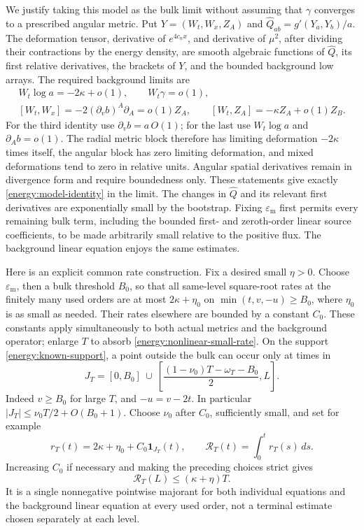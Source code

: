 We justify taking this model as the bulk limit without assuming that
\(\gamma\) converges to a prescribed angular metric. Put
\(Y=(W_t,W_x,Z_A)\) and \(\widehat Q_{ab}=g'(Y_a,Y_b)/a\).
The deformation tensor, derivative of \(e^{4c_nx}\), and derivative
of \(\mu^2\), after dividing their contractions by the energy
density, are smooth algebraic functions of \(\widehat Q\), its
first relative derivatives, the brackets of \(Y\), and the bounded
background low arrays. The required background limits are
\begin{equation}\label{energy:deformation-limits}
 \begin{gathered}
 W_t\log a=-2\kappa+o(1),\qquad W_t\gamma=o(1),\\
 [W_t,W_x]=-2(\partial_vb)^A\partial_A=o(1)Z_A,\qquad
 [W_t,Z_A]=-\kappa Z_A+o(1)Z_B.
 \end{gathered}
\end{equation}
For the third identity use \(\partial_vb=a\,O(1)\); for the last
use \(W_t\log a\) and \(\partial_Ab=o(1)\). The radial metric
block therefore has limiting deformation \(-2\kappa\) times
itself, the angular block has zero limiting deformation, and mixed
deformations tend to zero in relative units. Angular spatial
derivatives remain in divergence form and require boundedness only.
These statements give exactly \eqref{energy:model-identity} in the
limit. The changes in \(\widehat Q\) and its relevant first
derivatives are exponentially small by the bootstrap. Fixing
\(\varepsilon_{\mathrm m}\) first permits every remaining bulk term, including
the bounded first- and zeroth-order linear source coefficients, to be
made arbitrarily small relative to the positive flux. The background
linear equation enjoys the same estimates.

Here is an explicit common rate construction. Fix a desired small
\(\eta>0\). Choose \(\varepsilon_{\mathrm m}\), then a bulk threshold
\(B_0\), so that all same-level square-root rates at the finitely
many used orders are at most \(2\kappa+\eta_0\) on
\(\min(t,v,-u)\ge B_0\), where \(\eta_0\) is as small as needed.
Their rates elsewhere are bounded by a constant \(C_0\). These
constants apply simultaneously to both actual metrics and the
background operator; enlarge \(T\) to absorb
\eqref{energy:nonlinear-small-rate}. On the support
\eqref{energy:known-support}, a point outside the bulk can occur only
at times in
\[
 J_T=[0,B_0]\ \cup\
 \left[\frac{(1-\nu_0)T-\omega_T-B_0}{2},L\right].
\]
Indeed \(v\ge B_0\) for large \(T\), and \(-u=v-2t\).
In particular \(|J_T|\le\nu_0T/2+O(B_0+1)\). Choose \(\nu_0\)
after \(C_0\), sufficiently small, and set for example
\begin{equation}\label{energy:common-rate}
 r_T(t)=2\kappa+\eta_0+C_0\mathbf1_{J_T}(t),\qquad
 \mathcal R_T(t)=\int_0^t r_T(s)\,ds.
\end{equation}
Increasing \(C_0\) if necessary and making the preceding choices
strict gives
\begin{equation}\label{energy:rate-integral}
 \mathcal R_T(L)\le(\kappa+\eta)T.
\end{equation}
It is a single nonnegative pointwise majorant for both individual
equations and the background linear equation at every used order,
not a terminal estimate chosen separately at each level.

